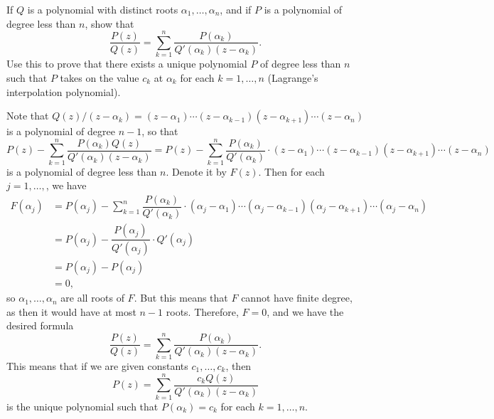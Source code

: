 \begin{exercise}
	If $Q$ is a polynomial with distinct roots $\alpha_1,\dots,\alpha_n$, and if $P$ is a polynomial of degree less than $n$, show that $$\dfrac{P(z)}{Q(z)}=\sum_{k=1}^{n}\dfrac{P(\alpha_k)}{Q'(\alpha_k)(z-\alpha_k)}.$$ Use this to prove that there exists a unique polynomial $P$ of degree less than $n$ such that $P$ takes on the value $c_k$ at $\alpha_k$ for each $k=1,\dots,n$ (Lagrange's interpolation polynomial).
	
	\begin{sol}
		Note that $Q(z)/(z-\alpha_k)=(z-\alpha_1) \cdots (z-\alpha_{k-1})(z-\alpha_{k+1}) \cdots (z-\alpha_n)$ is a polynomial of degree $n-1$, so that $$P(z)-\sum_{k=1}^{n}\dfrac{P(\alpha_k)Q(z)}{Q'(\alpha_k)(z-\alpha_k)}=P(z)-\sum_{k=1}^{n}\dfrac{P(\alpha_k)}{Q'(\alpha_k)} \cdot (z-\alpha_1) \cdots (z-\alpha_{k-1})(z-\alpha_{k+1}) \cdots (z-\alpha_n)$$ is a polynomial of degree less than $n$. Denote it by $F(z)$. Then for each $j=1,\dots,$, we have
		\begin{align*}
			F(\alpha_j) &=P(\alpha_j)-\sum_{k=1}^{n}\dfrac{P(\alpha_k)}{Q'(\alpha_k)} \cdot (\alpha_j-\alpha_1) \cdots (\alpha_j-\alpha_{k-1})(\alpha_j-\alpha_{k+1}) \cdots (\alpha_j-\alpha_n) \\
			&=P(\alpha_j)-\dfrac{P(\alpha_j)}{Q'(\alpha_j)} \cdot Q'(\alpha_j) \\
			&=P(\alpha_j)-P(\alpha_j) \\
			&=0,
		\end{align*}
		so $\alpha_1,\dots,\alpha_n$ are all roots of $F$. But this means that $F$ cannot have finite degree, as then it would have at most $n-1$ roots. Therefore, $F=0$, and we have the desired formula $$\dfrac{P(z)}{Q(z)}=\sum_{k=1}^{n}\dfrac{P(\alpha_k)}{Q'(\alpha_k)(z-\alpha_k)}.$$ This means that if we are given constants $c_1,\dots,c_k$, then $$P(z)=\sum_{k=1}^{n}\dfrac{c_kQ(z)}{Q'(\alpha_k)(z-\alpha_k)}$$ is the unique polynomial such that $P(\alpha_k)=c_k$ for each $k=1,\dots,n$.
	\end{sol}
\end{exercise}

